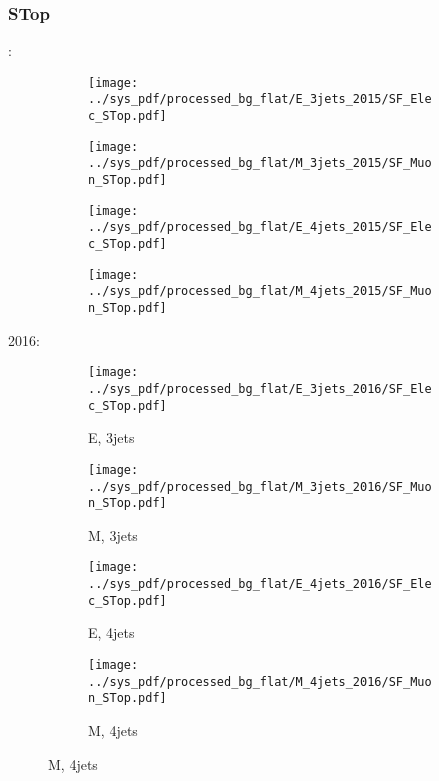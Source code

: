 \documentclass{beamer}
\begin{document}
\begin{frame}
\frametitle{STop}
\fontsize{5}{1}:
\begin{figure}
\centering
\begin{subfigure}[b]{0.24\textwidth}
\texttt{[image: ../sys\_pdf/processed\_bg\_flat/E\_3jets\_2015/SF\_Elec\_STop.pdf]}
\end{subfigure}
\begin{subfigure}[b]{0.24\textwidth}
\texttt{[image: ../sys\_pdf/processed\_bg\_flat/M\_3jets\_2015/SF\_Muon\_STop.pdf]}
\end{subfigure}
\begin{subfigure}[b]{0.24\textwidth}
\texttt{[image: ../sys\_pdf/processed\_bg\_flat/E\_4jets\_2015/SF\_Elec\_STop.pdf]}
\end{subfigure}
\begin{subfigure}[b]{0.24\textwidth}
\texttt{[image: ../sys\_pdf/processed\_bg\_flat/M\_4jets\_2015/SF\_Muon\_STop.pdf]}
\end{subfigure}
\end{figure}
2016:
\begin{figure}
\centering
\begin{subfigure}[b]{0.24\textwidth}
\texttt{[image: ../sys\_pdf/processed\_bg\_flat/E\_3jets\_2016/SF\_Elec\_STop.pdf]}
\captionsetup{font=tiny}
\caption{E, 3jets}
\end{subfigure}
\begin{subfigure}[b]{0.24\textwidth}
\texttt{[image: ../sys\_pdf/processed\_bg\_flat/M\_3jets\_2016/SF\_Muon\_STop.pdf]}
\captionsetup{font=tiny}
\caption{M, 3jets}
\end{subfigure}
\begin{subfigure}[b]{0.24\textwidth}
\texttt{[image: ../sys\_pdf/processed\_bg\_flat/E\_4jets\_2016/SF\_Elec\_STop.pdf]}
\captionsetup{font=tiny}
\caption{E, 4jets}
\end{subfigure}
\begin{subfigure}[b]{0.24\textwidth}
\texttt{[image: ../sys\_pdf/processed\_bg\_flat/M\_4jets\_2016/SF\_Muon\_STop.pdf]}
\captionsetup{font=tiny}
\caption{M, 4jets}
\end{subfigure}
\end{figure}
\end{frame}
\end{document}
